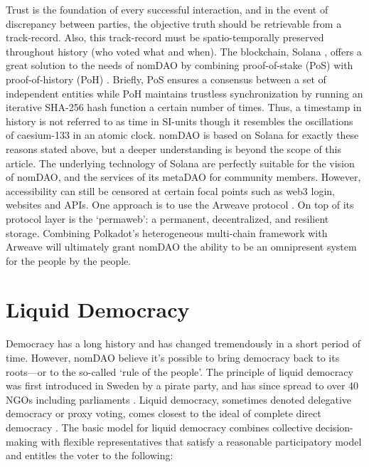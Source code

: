 \documentclass[12pt]{article}
\begin{document}
Trust is the foundation of every successful interaction, and in the event of discrepancy between parties, the objective truth should be retrievable from a track-record. Also, this track-record must be spatio-temporally preserved throughout history (who voted what and when). The blockchain, Solana \cite{SolanaWhitepaper}, offers a great solution to the needs of nomDAO by combining proof-of-stake (PoS) with proof-of-history (PoH) \cite{solanaIntro}. Briefly, PoS ensures a consensus between a set of independent entities while PoH maintains trustless synchronization by running an iterative SHA-256 hash function a certain number of times. Thus, a timestamp in history is not referred to as time in SI-units though it resembles the oscillations of caesium-133 in an atomic clock. nomDAO is based on Solana for exactly these reasons stated above, but a deeper understanding is beyond the scope of this article. The underlying technology of Solana are perfectly suitable for the vision of nomDAO, and the services of its metaDAO for community members. However, accessibility can still be censored at certain focal points such as web3 login, websites and APIs. One approach is to use the Arweave protocol \cite{arweave}. On top of its protocol layer is the ‘permaweb’: a permanent, decentralized, and resilient storage. Combining Polkadot’s heterogeneous multi-chain framework \cite{polkadot} with Arweave will ultimately grant nomDAO the ability to be an omnipresent system for the people by the people.

\section*{Liquid Democracy}
Democracy has a long history and has changed tremendously in a short period of time. However, nomDAO believe it's possible to bring democracy back to its roots—or to the so-called ‘rule of the people’. The principle of liquid democracy was first introduced in Sweden by a pirate party, and has since spread to over 40 NGOs including parliaments \cite{liquidDemocracy}. Liquid democracy, sometimes denoted delegative democracy or proxy voting, comes closest to the ideal of complete direct democracy \cite{id1, steffenGanghof}. The basic model for liquid democracy combines collective decision-making with flexible representatives that satisfy a reasonable participatory model and entitles the voter to the following:
\end{document}
